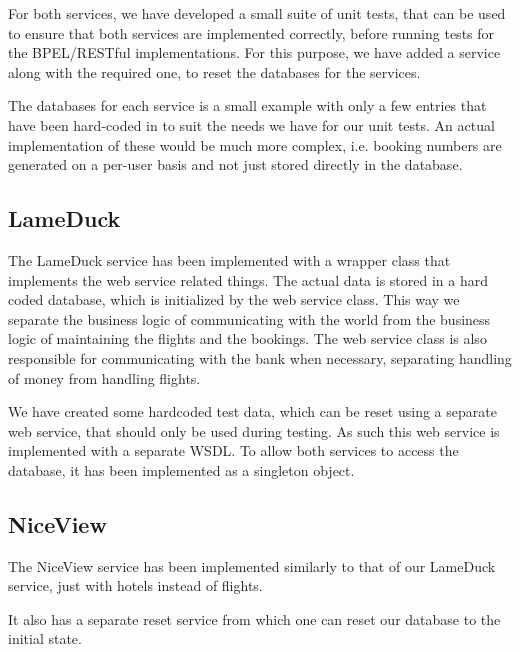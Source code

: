 For both services, we have developed a small suite of unit tests, that can be used to ensure that both services are implemented correctly, before running tests for the BPEL/RESTful implementations. For this purpose, we have added a service along with the required one, to reset the databases for the services.

The databases for each service is a small example with only a few entries that have been hard-coded in to suit the needs we have for our unit tests. An actual implementation of these would be much more complex, i.e. booking numbers are generated on a per-user basis and not just stored directly in the database.

\subsection{LameDuck}
The LameDuck service has been implemented with a wrapper class that implements the web service related things. The actual data is stored in a hard coded database, which is initialized by the web service class. This way we separate the business logic of communicating with the world from the business logic of maintaining the flights and the bookings. The web service class is also responsible for communicating with the bank when necessary, separating handling of money from handling flights.

We have created some hardcoded test data, which can be reset using a separate web service, that should only be used during testing. As such this web service is implemented with a separate WSDL. To allow both services to access the database, it has been implemented as a singleton object.


\subsection{NiceView}
The NiceView service has been implemented similarly to that of our LameDuck service, just with hotels instead of flights.

It also has a separate reset service from which one can reset our database to the initial state.


